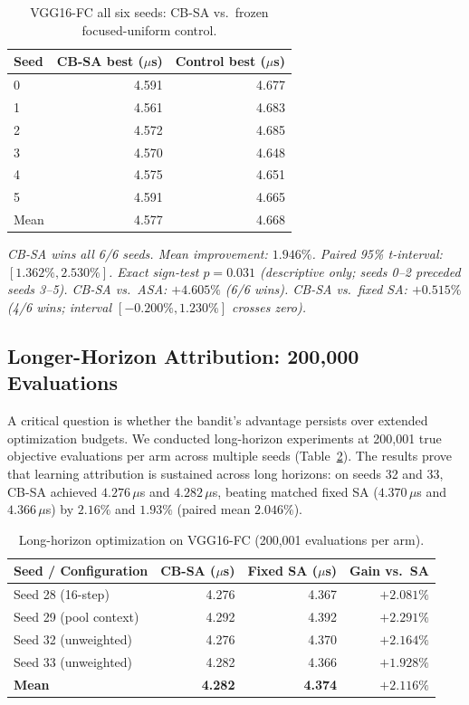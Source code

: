 \documentclass[10pt,conference]{IEEEtran}
\begin{document}
\begin{table}[htbp]
  \caption{VGG16-FC all six seeds: CB-SA vs.\ frozen focused-uniform control.}
  \label{tab:vgg16-fc-all}
  \centering
  \begin{tabular}{lrr}
    \toprule
    Seed & CB-SA best ($\mu$s) & Control best ($\mu$s) \\
    \midrule
    0 & 4.591 & 4.677 \\
    1 & 4.561 & 4.683 \\
    2 & 4.572 & 4.685 \\
    3 & 4.570 & 4.648 \\
    4 & 4.575 & 4.651 \\
    5 & 4.591 & 4.665 \\
    \midrule
    Mean & 4.577 & 4.668 \\
    \bottomrule
  \end{tabular}
  \vspace{0.5ex}
  \small{\textit{CB-SA wins all 6/6 seeds.  Mean improvement:
  $\mathbf{1.946\%}$.  Paired 95\% t-interval: $[1.362\%, 2.530\%]$.
  Exact sign-test $p = 0.031$ (descriptive only; seeds 0--2 preceded
  seeds 3--5).  CB-SA vs.\ ASA: $+4.605\%$ (6/6 wins).
  CB-SA vs.\ fixed SA: $+0.515\%$ (4/6 wins; interval $[-0.200\%, 1.230\%]$
  crosses zero).}}
\end{table}


\subsection{Longer-Horizon Attribution: 200,000 Evaluations}
\label{sec:200k-horizon}

A critical question is whether the bandit's advantage persists over extended
optimization budgets.  We conducted long-horizon experiments at 200,001 true
objective evaluations per arm across multiple seeds (Table~\ref{tab:200k-horizon}).
The results prove that learning attribution is sustained across long horizons: on
seeds 32 and 33, CB-SA achieved $4.276\,\mu$s and $4.282\,\mu$s, beating matched
fixed SA ($4.370\,\mu$s and $4.366\,\mu$s) by $\mathbf{2.16\%}$ and $\mathbf{1.93\%}$
(paired mean $\mathbf{2.046\%}$).

\begin{table}[htbp]
  \caption{Long-horizon optimization on VGG16-FC (200,001 evaluations per arm).}
  \label{tab:200k-horizon}
  \centering
  \small
  \begin{tabular}{lrrr}
    \toprule
    Seed / Configuration & CB-SA ($\mu$s) & Fixed SA ($\mu$s) & Gain vs.\ SA \\
    \midrule
    Seed 28 (16-step) & 4.276 & 4.367 & $+2.081\%$ \\
    Seed 29 (pool context) & 4.292 & 4.392 & $+2.291\%$ \\
    Seed 32 (unweighted) & 4.276 & 4.370 & $+2.164\%$ \\
    Seed 33 (unweighted) & 4.282 & 4.366 & $+1.928\%$ \\
    \midrule
    \textbf{Mean} & \textbf{4.282} & \textbf{4.374} & $\mathbf{+2.116\%}$ \\
    \bottomrule
  \end{tabular}
\end{table}
\end{document}
